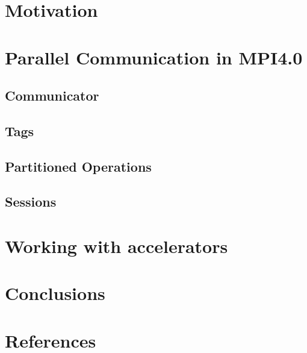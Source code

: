 \documentclass[sigconf]{acmart} %
\begin{document}
\section{Motivation}

\section{Parallel Communication in MPI4.0}

\subsection{Communicator}
\subsection{Tags}
\subsection{Partitioned Operations}
\subsection{Sessions} %

\section{Working with accelerators}


\section{Conclusions}
\section{References}
\end{document}

